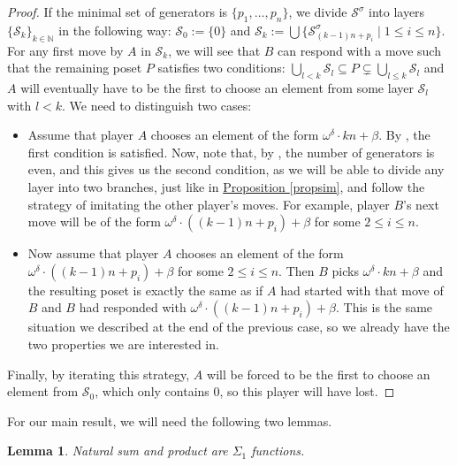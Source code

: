 \documentclass[reqno]{amsart}
\newtheorem{lemma}[theorem]{Lemma}
\theoremstyle{definition}
\theoremstyle{definition}
\theoremstyle{plain} %
\begin{document}
\begin{proof}
    If the minimal set of generators is $\{p_1,\dots,p_n\}$, we divide $\mathcal{S}^\sigma$ into layers $\{\mathcal{S}_k\}_{k\in\mathbb{N}}$ in the following way: $\mathcal{S}_0:=\{0\}$ and $\mathcal{S}_k:=\bigcup\{\mathcal{S}^\sigma_{(k-1)n+p_i} \mid 1\leq i\leq n \}$. For any first move by $A $ in $\mathcal{S}_k $, we will see that $B$ can respond with a move such that the remaining poset $P$ satisfies two conditions: $\bigcup_{l<k}\mathcal{S}_l\subseteq P\subsetneq\bigcup_{l\leq k}\mathcal{S}_l$ and $A$ will eventually have to be the first to choose an element from some layer $\mathcal{S}_l$ with $l<k$. We need to distinguish two cases:
    \begin{itemize}
    \item[\textit{i})] Assume that player $A$ chooses an element of the form $ \omega^\delta\cdot kn+\beta $. By \cite[Lemma 3.3]{ALCO_2018__1_3_371_0}, the first condition is satisfied. Now, note that, by \cite[Theorem 3.4]{ALCO_2018__1_3_371_0}, the number of generators is even, and this gives us the second condition, as we will be able to divide any layer into two branches, just like in \hyperref[propsim]{Proposition \ref{propsim}}, and follow the strategy of imitating the other player's moves. For example, player $B$'s next move will be of the form $\omega^\delta\cdot ((k-1)n+p_i)+\beta$ for some $2\leq i\leq n$.
    \item[\textit{ii})] Now assume that player $A$ chooses an element of the form $ \omega^\delta\cdot ((k-1)n+p_i)+\beta $ for some $2\leq i\leq n$. Then $B$ picks $ \omega^\delta\cdot kn+\beta $ and the resulting poset is exactly the same as if $A$ had started with that move of $B$ and $B$ had responded with $\omega^\delta\cdot ((k-1)n+p_i)+\beta$. This is the same situation we described at the end of the previous case, so we already have the two properties we are interested in.
    \end{itemize}Finally, by iterating this strategy, $A$ will be forced to be the first to choose an element from $\mathcal{S}_0$, which only contains $0$, so this player will have lost.
\end{proof}
For our main result, we will need the following two lemmas.
\begin{lemma}\label{sumprodef}
    Natural sum and product are $\Sigma_1$ functions.
\end{lemma}
\end{document}
